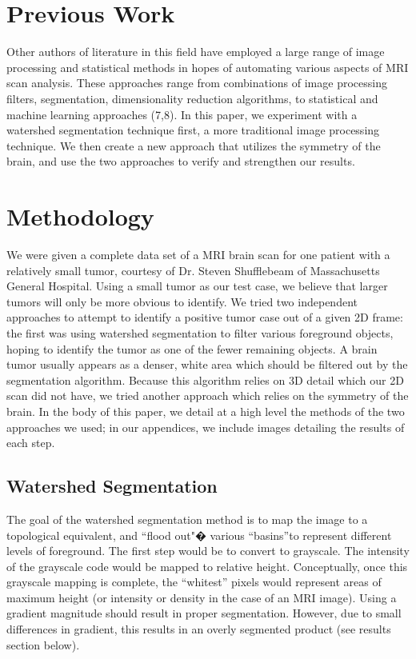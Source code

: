 \documentclass[12pt]{article}
\theoremstyle{plain}%
\theoremstyle{definition}
\theoremstyle{remark}
\begin{document}
\section{Previous Work}
Other authors of literature in this field have employed a large range of image processing and statistical methods in hopes of automating various aspects of MRI scan analysis. These approaches range from combinations of image processing filters, segmentation, dimensionality reduction algorithms, to statistical and machine learning approaches (7,8). In this paper, we experiment with a watershed segmentation technique first, a more traditional image processing technique. We then create a new approach that utilizes the symmetry of the brain, and use the two approaches to verify and strengthen our results.

\section{Methodology}

We were given a complete data set of a MRI brain scan for one patient with a relatively small tumor, courtesy of Dr. Steven Shufflebeam of Massachusetts General Hospital.  Using a small tumor as our test case, we believe that larger tumors will only be more obvious to identify. We tried two independent approaches to attempt to identify a positive tumor case out of a given 2D frame: the first was using watershed segmentation to filter various foreground objects, hoping to identify the tumor as one of the fewer remaining objects.  A brain tumor usually appears as a denser, white area which should be filtered out by the segmentation algorithm.  Because this algorithm relies on 3D detail which our 2D scan did not have, we tried another approach which relies on the symmetry of the brain. In the body of this paper, we detail at a high level the methods of the two approaches we used; in our appendices, we include images detailing the results of each step.

\subsection{Watershed Segmentation}

The goal of the watershed segmentation method is to map the image to a topological equivalent, and ``flood out"� various ``basins''to represent different levels of foreground.  The first step would be to convert to grayscale.  The intensity of the grayscale code would be mapped to relative height.  Conceptually, once this grayscale mapping is complete, the “whitest” pixels would represent areas of maximum height (or intensity or density in the case of an MRI image).  Using a gradient magnitude should result in proper segmentation.  However, due to small differences in gradient, this results in an overly segmented product (see results section below).
\end{document}
